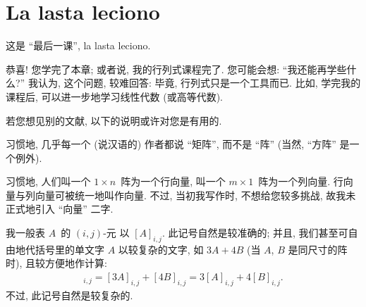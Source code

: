 \KunAsteriskoEnEnhavtabelo
\section{La lasta leciono}
\SenAsteriskoEnEnhavtabelo

\maldevigalegajxo

这是 ``最后一课'', la lasta leciono.

恭喜!
您学完了本章;
或者说, 我的行列式课程完了.
您可能会想:
``我还能再学些什么?''
我认为, 这个问题, 较难回答:
毕竟, 行列式只是一个工具而已.
比如,
学完我的课程后,
可以进一步地学习线性代数 (或高等代数).

若您想见别的文献,
以下的说明或许对您是有用的.

习惯地, 几乎每一个 (说汉语的) 作者都说 ``矩阵'',
而不是 ``阵''
(当然, ``方阵'' 是一个例外).

习惯地, 人们叫一个 \(1 \times n\)~阵为一个行向量,
叫一个 \(m \times 1\)~阵为一个列向量.
行向量与列向量可被统一地叫作向量.
不过, 当初我写作时, 不想给您较多挑战,
故我未正式地引入 ``向量'' 二字.

我一般表
\(A\)~的 \((i, j)\)-元
以 \([A]_{i,j}\).
此记号自然是较准确的;
并且,
我们甚至可自由地代括号里的单文字 \(A\)
以较复杂的文字, 如 \(3A + 4B\)
(当 \(A\), \(B\) 是同尺寸的阵时),
且较方便地作计算:
\begin{align*}
    [3A + 4B]_{i,j}
        = [3A]_{i,j} + [4B]_{i,j}
        = 3[A]_{i,j} + 4[B]_{i,j}.
\end{align*}
不过, 此记号自然是较复杂的.

